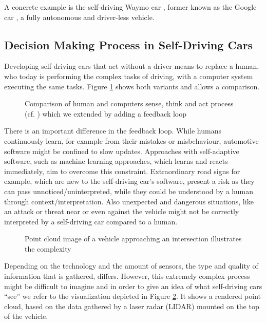 A concrete example is the self-driving Waymo car \cite{Waymo2017}, former known as the Google car \cite{Google2016}, a fully autonomous and driver-less vehicle. 


\subsection{Decision Making Process in Self-Driving Cars}
\label{sec:SelfDrivingCarsBasics:DecisionMakingProcess}

Developing self-driving cars that act without a driver means to replace a human, who today is performing the complex tasks of driving, with a computer system executing the same tasks. Figure  \ref{fig:ComparisonHumanComputerProcess} shows both variants and allows a comparison. 

\begin{figure}
\caption{Comparison of human and computers sense, think and act process (cf. \cite{Ghisio2016}) which we extended by adding a feedback loop}
\label{fig:ComparisonHumanComputerProcess}
\end{figure}

There is an important difference in the feedback loop. While humans continuously learn, for example from their mistakes or misbehaviour, automotive software might be confined to slow updates. Approaches with self-adaptive software, such as machine learning approaches, which learns and reacts immediately, aim to overcome this constraint. Extraordinary road signs for example, which are new to the self-driving car's software, present a risk as they can pass unnoticed/uninterpreted, while they could be understood by a human through context/interpretation. Also unexpected and dangerous situations, like an attack or threat near or even against the vehicle might not be correctly interpreted by a self-driving car compared to a human. 

\begin{figure}
\caption{Point cloud image of a vehicle approaching an intersection illustrates the complexity \cite{EarthImagingJournalEIJ:RemoteSensingSatelliteImages2012}}
\label{fig:PointCloudImageGoogle}
\end{figure}

Depending on the technology and the amount of sensors, the type and quality of information that is gathered, differs. However, this extremely complex process might be difficult to imagine and in order to give an idea of what self-driving cars \enquote{see} we refer to the visualization depicted in Figure \ref{fig:PointCloudImageGoogle}. It shows a rendered point cloud, based on the data gathered by a laser radar (LIDAR) mounted on the top of the vehicle. 


